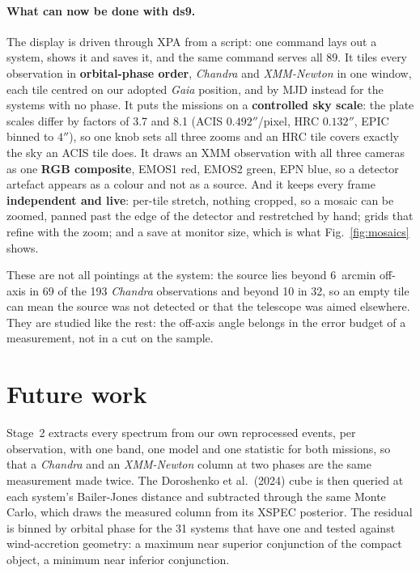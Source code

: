 \documentclass[10pt,a4paper]{article}
\begin{document}
\paragraph{What can now be done with ds9.} The display is driven through XPA from
a script: one command lays out a system, shows it and saves it, and the same
command serves all 89. It tiles every observation in
\textbf{orbital-phase order}, \textit{Chandra} and \textit{XMM-Newton} in one
window, each tile centred on our adopted \textit{Gaia} position, and by MJD
instead for the systems with no phase. It puts the missions on
a \textbf{controlled sky scale}: the plate scales differ by factors of 3.7 and
8.1 (ACIS $0.492''$/pixel, HRC $0.132''$, EPIC binned to $4''$), so one knob
sets all three zooms and an HRC tile covers exactly the sky an ACIS tile does.
It draws an XMM observation with all three cameras as one \textbf{RGB
composite}, EMOS1 red, EMOS2 green, EPN blue, so a detector artefact appears as
a colour and not as a source. And it keeps every frame \textbf{independent and
live}: per-tile stretch, nothing cropped, so a mosaic can be zoomed, panned past
the edge of the detector and restretched by hand; grids that refine with the zoom; and a save at monitor size, which is what
Fig.~\ref{fig:mosaics} shows.

These are not all pointings at the system: the source lies beyond 6~arcmin
off-axis in 69 of the 193 \textit{Chandra} observations and beyond 10 in 32, so
an empty tile can mean the source was not detected or that the telescope was
aimed elsewhere. They are studied like the rest: the off-axis angle belongs in the error budget
of a measurement, not in a cut on the sample.

\section{Future work}

Stage~2 extracts every spectrum from our own reprocessed events, per
observation, with one band, one model and one statistic for both missions, so
that a \textit{Chandra} and an \textit{XMM-Newton} column at two phases are the
same measurement made twice. The Doroshenko et al.\ (2024) cube is then queried
at each system's Bailer-Jones distance and subtracted through the same Monte
Carlo, which draws the measured column from its XSPEC posterior. The residual is
binned by orbital phase for the 31 systems that have one and tested against
wind-accretion geometry: a maximum near superior conjunction of the compact
object, a minimum near inferior conjunction.
\end{document}
